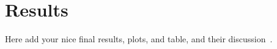 \section{Results}
Here add your nice final results, plots, and table, 
and their discussion~\cite{jp}.
